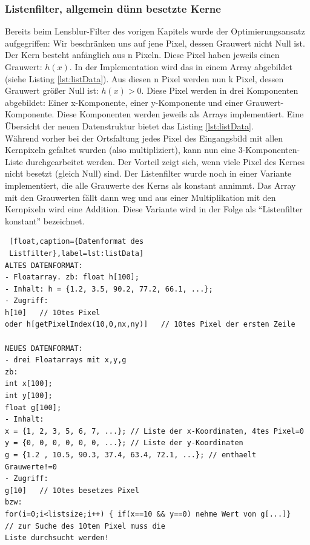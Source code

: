 \documentclass[a4paper,12pt]{article}
\begin{document}
\subsubsection{Listenfilter, allgemein dünn besetzte
Kerne}\label{chp:listFilter}
Bereits beim Lensblur-Filter des vorigen Kapitels wurde der Optimierungsansatz
aufgegriffen: Wir beschränken uns auf jene Pixel, dessen Grauwert nicht Null
ist. Der Kern besteht anfänglich aus n Pixeln. Diese Pixel haben jeweils einen
Grauwert: $h(x)$. In der Implementation wird das in einem Array abgebildet
(siehe Listing \ref{lst:listData}). Aus diesen n Pixel werden nun k Pixel, dessen
Grauwert größer Null ist: $h(x) > 0$. Diese Pixel werden in drei Komponenten
abgebildet:
Einer x-Komponente, einer y-Komponente und einer Grauwert-Komponente. Diese
Komponenten werden jeweils als Arrays implementiert. Eine Übersicht der neuen
Datenstruktur bietet das Listing \ref{lst:listData}. \\
Während vorher bei der Ortsfaltung jedes Pixel des Eingangsbild mit allen
Kernpixeln gefaltet wurden (also multipliziert), kann nun eine
3-Komponenten-Liste durchgearbeitet werden. Der Vorteil zeigt sich, wenn viele
Pixel des Kernes nicht besetzt (gleich Null) sind.
Der Listenfilter wurde noch in einer Variante implementiert, die alle Grauwerte
des Kerns als konstant annimmt. Das Array mit den Grauwerten fällt dann weg und
aus einer Multiplikation mit den Kernpixeln wird eine Addition. Diese Variante
wird in der Folge als "`Listenfilter konstant"' bezeichnet.

 \begin{lstlisting} [float,caption={Datenformat des
 Listfilter},label=lst:listData] 
ALTES DATENFORMAT:
- Floatarray. zb: float h[100];
- Inhalt: h = {1.2, 3.5, 90.2, 77.2, 66.1, ...};
- Zugriff: 
h[10]	// 10tes Pixel
oder h[getPixelIndex(10,0,nx,ny)]	// 10tes Pixel der ersten Zeile

NEUES DATENFORMAT:
- drei Floatarrays mit x,y,g
zb:
int x[100];
int y[100];
float g[100];
- Inhalt:
x = {1, 2, 3, 5, 6, 7, ...}; // Liste der x-Koordinaten, 4tes Pixel=0
y = {0, 0, 0, 0, 0, 0, ...}; // Liste der y-Koordinaten
g = {1.2 , 10.5, 90.3, 37.4, 63.4, 72.1, ...}; // enthaelt Grauwerte!=0
- Zugriff:
g[10]	// 10tes besetzes Pixel
bzw:
for(i=0;i<listsize;i++) { if(x==10 && y==0) nehme Wert von g[...]}	
// zur Suche des 10ten Pixel muss die
Liste durchsucht werden!

 \end{lstlisting}
\end{document}
